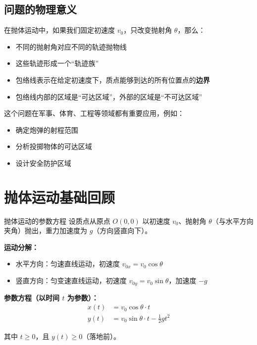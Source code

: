 \documentclass[a4paper,11pt]{ctexart}
\begin{document}
\subsection{问题的物理意义}

在抛体运动中，如果我们固定初速度 $v_0$，只改变抛射角 $\theta$，那么：
\begin{itemize}
    \item 不同的抛射角对应不同的轨迹抛物线
    \item 这些轨迹形成一个“轨迹族”
    \item 包络线表示在给定初速度下，质点能够到达的所有位置点的\textbf{边界}
    \item 包络线内部的区域是“可达区域”，外部的区域是“不可达区域”
\end{itemize}

这个问题在军事、体育、工程等领域都有重要应用，例如：
\begin{itemize}
    \item 确定炮弹的射程范围
    \item 分析投掷物体的可达区域
    \item 设计安全防护区域
\end{itemize}

\section{抛体运动基础回顾}

\begin{definitionbox}{抛体运动的参数方程}
设质点从原点 $O(0,0)$ 以初速度 $v_0$、抛射角 $\theta$（与水平方向夹角）抛出，重力加速度为 $g$（方向竖直向下）。

\textbf{运动分解：}
\begin{itemize}
    \item 水平方向：匀速直线运动，初速度 $v_{0x} = v_0\cos\theta$
    \item 竖直方向：匀变速直线运动，初速度 $v_{0y} = v_0\sin\theta$，加速度 $-g$
\end{itemize}

\textbf{参数方程（以时间 $t$ 为参数）：}
\begin{align}
    x(t) &= v_0\cos\theta \cdot t \label{eq:x}\\
    y(t) &= v_0\sin\theta \cdot t - \frac{1}{2}gt^2 \label{eq:y}
\end{align}

其中 $t \geq 0$，且 $y(t) \geq 0$（落地前）。
\end{definitionbox}
\end{document}

